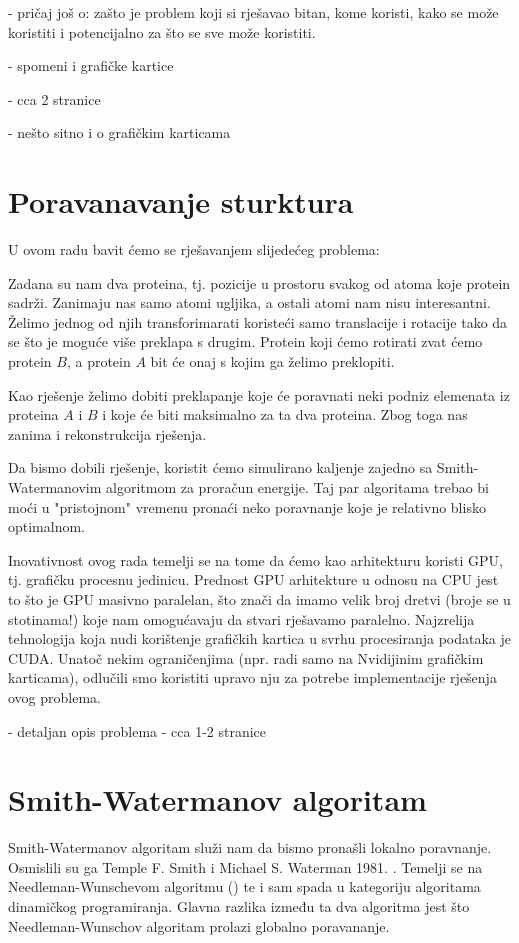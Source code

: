 \documentclass[times, utf8, zavrsni]{fer}
\begin{document}
- pričaj još o: zašto je problem koji si rješavao bitan,
kome koristi, kako se može koristiti i potencijalno za što se
sve može koristiti.

- spomeni i grafičke kartice

- cca 2 stranice

- nešto sitno i o grafičkim karticama

\chapter{Poravanavanje sturktura}
U ovom radu bavit ćemo se rješavanjem slijedećeg problema: 

Zadana su nam dva proteina, tj. pozicije u prostoru svakog od atoma
koje protein sadrži. Zanimaju nas samo atomi ugljika, a ostali atomi
nam nisu interesantni. Želimo jednog od njih transforimarati 
koristeći samo translacije i rotacije tako da se što je moguće više
preklapa s drugim. Protein koji ćemo rotirati zvat ćemo protein $B$,
a protein $A$ bit će onaj s kojim ga želimo preklopiti. 

Kao rješenje želimo dobiti preklapanje koje će poravnati
neki podniz elemenata iz proteina $A$ i $B$ i koje će biti maksimalno
za ta dva proteina. Zbog toga nas zanima i rekonstrukcija rješenja. 

Da bismo dobili rješenje, koristit ćemo simulirano kaljenje 
zajedno sa Smith-Wa{\-}ter{\-}man{\-}ovim algoritmom za proračun energije. 
Taj par algoritama trebao bi moći u "pristojnom" vremenu pronaći
neko poravnanje koje je relativno blisko optimalnom. 

Inovativnost ovog rada temelji se na tome da ćemo kao arhitekturu
koristi GPU, tj. grafičku procesnu jedinicu. Prednost GPU arhitekture
u odnosu na CPU jest to što je GPU masivno paralelan, što znači
da imamo velik broj dretvi (broje se u stotinama!) koje nam omogućavaju
da stvari rješavamo paralelno. Najzrelija tehnologija koja nudi
korištenje grafičkih kartica u svrhu procesiranja podataka je CUDA.
Unatoč nekim ograničenjima (npr. radi samo na Nvidijinim grafičkim
karticama), odlučili smo koristiti upravo nju za potrebe implementacije
rješenja ovog problema. 

- detaljan opis problema
- cca 1-2 stranice

\chapter{Smith-Watermanov algoritam}
Smith-Watermanov algoritam služi nam da bismo pronašli lokalno poravnanje. 
Osmislili su ga Temple F. Smith i Michael S. Waterman 1981. \cite{smithwaterman1981}.
Temelji se na Needleman-Wunschevom algoritmu (\cite{needlemanwunsch1970})
te i sam spada u kategoriju algoritama dinamičkog programiranja. Glavna razlika
između ta dva algoritma jest što Needleman-Wunschov algoritam prolazi globalno
poravananje.
\end{document}

